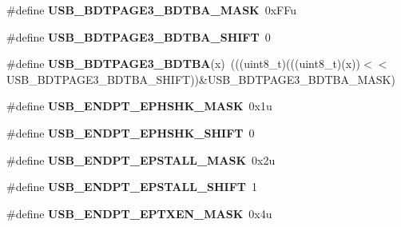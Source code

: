 \begin{DoxyCompactItemize}
\item 
\#define {\bfseries U\+S\+B\+\_\+\+B\+D\+T\+P\+A\+G\+E3\+\_\+\+B\+D\+T\+B\+A\+\_\+\+M\+A\+SK}~0x\+F\+Fu\hypertarget{group__USB__Register__Masks_ga9081479345a744c85a74643600921b64}{}\label{group__USB__Register__Masks_ga9081479345a744c85a74643600921b64}

\item 
\#define {\bfseries U\+S\+B\+\_\+\+B\+D\+T\+P\+A\+G\+E3\+\_\+\+B\+D\+T\+B\+A\+\_\+\+S\+H\+I\+FT}~0\hypertarget{group__USB__Register__Masks_ga9850caac94013a6e84f9af9cbe0e0827}{}\label{group__USB__Register__Masks_ga9850caac94013a6e84f9af9cbe0e0827}

\item 
\#define {\bfseries U\+S\+B\+\_\+\+B\+D\+T\+P\+A\+G\+E3\+\_\+\+B\+D\+T\+BA}(x)~(((uint8\+\_\+t)(((uint8\+\_\+t)(x))$<$$<$U\+S\+B\+\_\+\+B\+D\+T\+P\+A\+G\+E3\+\_\+\+B\+D\+T\+B\+A\+\_\+\+S\+H\+I\+FT))\&U\+S\+B\+\_\+\+B\+D\+T\+P\+A\+G\+E3\+\_\+\+B\+D\+T\+B\+A\+\_\+\+M\+A\+SK)\hypertarget{group__USB__Register__Masks_ga1576cadd83c016ae56239b96238ffeb8}{}\label{group__USB__Register__Masks_ga1576cadd83c016ae56239b96238ffeb8}

\item 
\#define {\bfseries U\+S\+B\+\_\+\+E\+N\+D\+P\+T\+\_\+\+E\+P\+H\+S\+H\+K\+\_\+\+M\+A\+SK}~0x1u\hypertarget{group__USB__Register__Masks_ga9266b40af26177a6659041e0229e76e7}{}\label{group__USB__Register__Masks_ga9266b40af26177a6659041e0229e76e7}

\item 
\#define {\bfseries U\+S\+B\+\_\+\+E\+N\+D\+P\+T\+\_\+\+E\+P\+H\+S\+H\+K\+\_\+\+S\+H\+I\+FT}~0\hypertarget{group__USB__Register__Masks_ga477c6b1ea91137b6ebd65d0574a7b611}{}\label{group__USB__Register__Masks_ga477c6b1ea91137b6ebd65d0574a7b611}

\item 
\#define {\bfseries U\+S\+B\+\_\+\+E\+N\+D\+P\+T\+\_\+\+E\+P\+S\+T\+A\+L\+L\+\_\+\+M\+A\+SK}~0x2u\hypertarget{group__USB__Register__Masks_ga57a65ef14a5d868dcd964177fe6daad2}{}\label{group__USB__Register__Masks_ga57a65ef14a5d868dcd964177fe6daad2}

\item 
\#define {\bfseries U\+S\+B\+\_\+\+E\+N\+D\+P\+T\+\_\+\+E\+P\+S\+T\+A\+L\+L\+\_\+\+S\+H\+I\+FT}~1\hypertarget{group__USB__Register__Masks_ga38af6f0d87e04be4f9f19cca981765cb}{}\label{group__USB__Register__Masks_ga38af6f0d87e04be4f9f19cca981765cb}

\item 
\#define {\bfseries U\+S\+B\+\_\+\+E\+N\+D\+P\+T\+\_\+\+E\+P\+T\+X\+E\+N\+\_\+\+M\+A\+SK}~0x4u\hypertarget{group__USB__Register__Masks_ga3d498f31497071c5ff6ad30e89b7c26e}{}\label{group__USB__Register__Masks_ga3d498f31497071c5ff6ad30e89b7c26e}


\end{DoxyCompactItemize}
